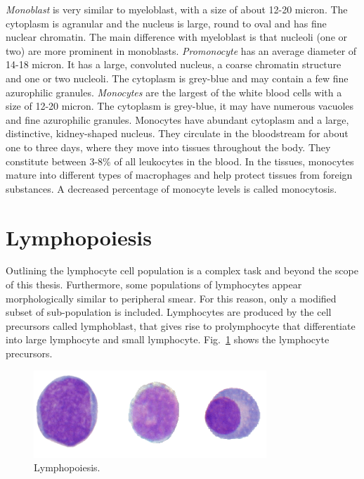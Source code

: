 \textit{Monoblast} is very similar to myeloblast, with a size of about 12-20 micron. The cytoplasm is agranular and the nucleus is large, round to oval and has fine nuclear chromatin. The main difference with myeloblast is that nucleoli (one or two) are more prominent in monoblasts. \textit{Promonocyte} has an average diameter of 14-18 micron. It has a large, convoluted nucleus, a coarse chromatin structure and one or two nucleoli. The cytoplasm is grey-blue and may contain a few fine azurophilic granules. \textit{Monocytes} are the largest of the white blood cells with a size of 12-20 micron. The cytoplasm is grey-blue, it may have numerous vacuoles and fine azurophilic granules. Monocytes have abundant cytoplasm and a large, distinctive, kidney-shaped nucleus. They circulate in the bloodstream for about one to three days, where they move into tissues throughout the body. They constitute between 3-8\% of all leukocytes in the blood. In the tissues, monocytes mature into different types of macrophages and help protect tissues from foreign substances. A decreased percentage of monocyte levels is called monocytosis.

\section{Lymphopoiesis}
Outlining the lymphocyte cell population is a complex task and beyond the scope of this thesis. Furthermore, some populations of lymphocytes appear morphologically similar to peripheral smear. For this reason, only a modified subset of sub-population is included. Lymphocytes are produced by the cell precursors called lymphoblast, that gives rise to prolymphocyte that differentiate into large lymphocyte and small lymphocyte.
Fig.~\ref{fig:Lymphopoiesis} shows the lymphocyte precursors.

\begin{figure}[!htbp]
	\centering
	\includegraphics[width=0.78\textwidth]{images/lymphopoiesis}
	\caption{\label{fig:Lymphopoiesis} Lymphopoiesis.}
\end{figure}

